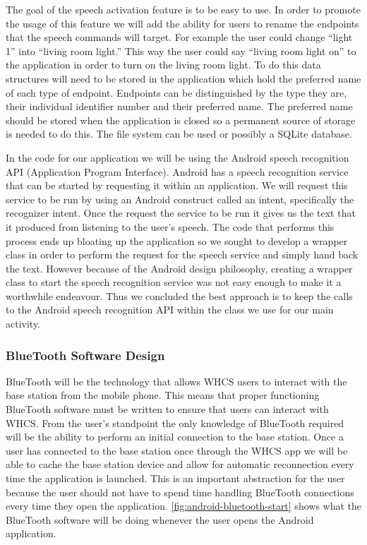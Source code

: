 The goal of the speech activation feature is to be easy to use. In order to
promote the usage of this feature we will add the ability for users to rename
the endpoints that the speech commands will target. For example the user could
change {}``light 1'' into {}``living room light.'' This way the user could say
{}``living room light on{}'' to the application in order to turn on the living
room light. To do this data structures will need to be stored in the
application which hold the preferred name of each type of endpoint. Endpoints
can be distinguished by the type they are, their individual identifier number
and their preferred name. The preferred name should be stored when the
application is closed so a permanent source of storage is needed to do this.
The file system can be used or possibly a SQLite database.

In the code for our application we will be using the Android speech recognition
API (Application Program Interface).  Android has a speech recognition service
that can be started by requesting it within an application. We will request
this service to be run by using an Android construct called an intent,
specifically the recognizer intent. Once the request the service to be run it
gives us the text that it produced from listening to the user{}'s speech. The
code that performs this process ends up bloating up the application so we
sought to develop a wrapper class in order to perform the request for the
speech service and simply hand back the text. However because of the Android
design philosophy, creating a wrapper class to start the speech recognition
service was not easy enough to make it a worthwhile endeavour. Thus we
concluded the best approach is to keep the calls to the Android speech
recognition API within the class we use for our main activity.

\subsubsection{BlueTooth Software Design} BlueTooth will be the technology that
allows WHCS users to interact with the base station from the mobile phone. This
means that proper functioning BlueTooth software must be written to ensure that
users can interact with WHCS. From the user{}'s standpoint the only knowledge
of BlueTooth required will be the ability to perform an initial connection to
the base station. Once a user has connected to the base station once through
the WHCS app we will be able to cache the base station device and allow for
automatic reconnection every time the application is launched. This is an
important abstraction for the user because the user should not have to spend
time handling BlueTooth connections every time they open the application.
\autoref{fig:android-bluetooth-start} shows what the BlueTooth software will be
doing whenever the user opens the Android application.

